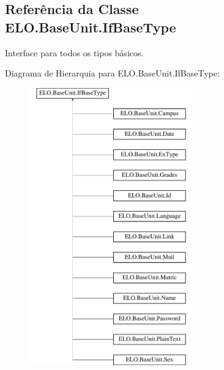 \hypertarget{classELO_1_1BaseUnit_1_1IfBaseType}{}\subsection{Referência da Classe E\+L\+O.\+Base\+Unit.\+If\+Base\+Type}
\label{classELO_1_1BaseUnit_1_1IfBaseType}


Interface para todos os tipos básicos.  


Diagrama de Hierarquia para E\+L\+O.\+Base\+Unit.\+If\+Base\+Type\+:\begin{figure}[H]
\begin{center}
\leavevmode
\includegraphics[height=12.000000cm]{d7/d79/classELO_1_1BaseUnit_1_1IfBaseType}
\end{center}
\end{figure}
